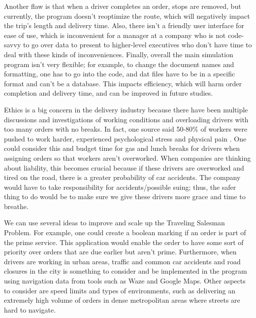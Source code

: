 \documentclass[letterpaper]{article}
\begin{document}
    Another flaw is that when a driver completes an order, stops are removed, but currently, the program doesn’t reoptimize the route, which will negatively impact the trip's length and delivery time. Also, there isn’t a friendly user interface for ease of use, which is inconvenient for a manager at a company who is not code-savvy to go over data to present to higher-level executives who don’t have time to deal with these kinds of inconveniences. Finally, overall the main simulation program isn’t very flexible; for example, to change the document names and formatting, one has to go into the code, and dat files have to be in a specific format and can’t be a database. This impacts efficiency, which will harm order completion and delivery time, and can be improved in future studies. 

    Ethics is a big concern in the delivery industry because there have been multiple discussions and investigations of working conditions and overloading drivers with too many orders with no breaks. In fact, one source said 50-80\% of workers were pushed to work harder, experienced psychological stress and physical pain \cite{cite:pasternack2019}. One could consider this and budget time for gas and lunch breaks for drivers when assigning orders so that workers aren’t overworked. When companies are thinking about liability, this becomes crucial because if these drivers are overworked and tired on the road, there is a greater probability of car accidents. The company would have to take responsibility for accidents/possible suing; thus, the safer thing to do would be to make sure we give these drivers more grace and time to breathe.

    We can use several ideas to improve and scale up the Traveling Salesman Problem. For example, one could create a boolean marking if an order is part of the prime service. This application would enable the order to have some sort of priority over orders that are due earlier but aren’t prime. Furthermore, when drivers are working in urban areas, traffic and common car accidents and road closures in the city is something to consider and be implemented in the program using navigation data from tools such as Waze and Google Maps. Other aspects to consider are speed limits and types of environments, such as delivering an extremely high volume of orders in dense metropolitan areas where streets are hard to navigate. 
\end{document}
